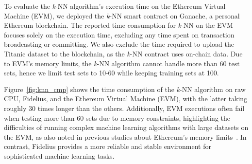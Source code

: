 To evaluate the \textit{k}-NN algorithm's execution time on the Ethereum Virtual Machine (EVM), we deployed the \textit{k}-NN smart contract on Ganache, a personal Ethereum blockchain. The reported time consumption for \textit{k}-NN on the EVM focuses solely on the execution time, excluding any time spent on transaction broadcasting or committing. We also exclude the time required to upload the Titanic dataset to the blockchain, as the \textit{k}-NN contract uses on-chain data. Due to EVM's memory limits, the \textit{k}-NN algorithm cannot handle more than 60 test sets, hence we limit test sets to 10-60 while keeping training sets at 100.


Figure~\ref{fig:knn_cmp} shows the time consumption of the \textit{k}-NN algorithm on raw CPU, Fidelius, and the Ethereum Virtual Machine (EVM), with the latter taking roughly 30 times longer than the others. Additionally, EVM executions often fail when testing more than 60 sets due to memory constraints, highlighting the difficulties of running complex machine learning algorithms with large datasets on the EVM, as also noted in previous studies about Ethereum's memory limits~\cite{dinh2017blockbench}. In contrast, Fidelius provides a more reliable and stable environment for sophisticated machine learning tasks.
